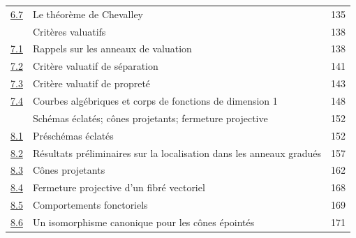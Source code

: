 \begin{longtable}{@{}p{}p{}r@{}}
\hyperref[subsection:II.6.7-fr]{6.7} & Le théorème de Chevalley & 135\\
\hyperref[section:II.7-fr]{\textsection7} & Critères valuatifs & 138\\
\hyperref[subsection:II.7.1-fr]{7.1} & Rappels sur les anneaux de valuation & 138\\
\hyperref[subsection:II.7.2-fr]{7.2} & Critère valuatif de séparation & 141\\
\hyperref[subsection:II.7.3-fr]{7.3} & Critère valuatif de propreté & 143\\
\hyperref[subsection:II.7.4-fr]{7.4} & Courbes algébriques et corps de fonctions de dimension 1 & 148\\
\hyperref[section:II.8-fr]{\textsection8} & Schémas éclatés; cônes projetants; fermeture projective & 152\\
\hyperref[subsection:II.8.1-fr]{8.1} & Préschémas éclatés & 152\\
\hyperref[subsection:II.8.2-fr]{8.2} & Résultats préliminaires sur la localisation dans les anneaux gradués & 157\\
\hyperref[subsection:II.8.3-fr]{8.3} & Cônes projetants & 162\\
\hyperref[subsection:II.8.4-fr]{8.4} & Fermeture projective d'un fibré vectoriel & 168\\
\hyperref[subsection:II.8.5-fr]{8.5} & Comportements fonctoriels & 169\\
\hyperref[subsection:II.8.6-fr]{8.6} & Un isomorphisme canonique pour les cônes épointés & 171\\
\end{longtable}
